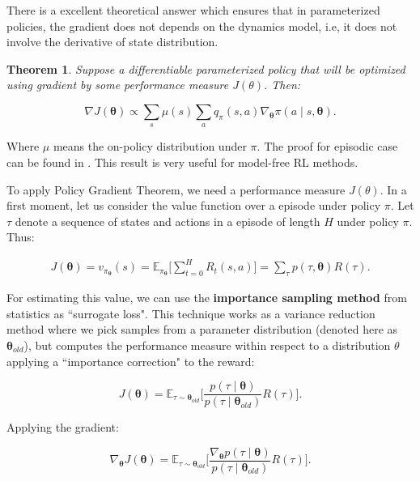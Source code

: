 There is a excellent theoretical answer which ensures that in parameterized policies, the gradient does not depends on the dynamics model, i.e, it does not involve the derivative of state distribution.

\newtheorem{pg}{Theorem}
\begin{pg}
	Suppose a differentiable parameterized policy that will be optimized using gradient by some performance measure $J(\theta)$. Then:
	
	\begin{equation}
	\nabla J(\boldsymbol{\theta}) \propto \sum_{s}\mu(s)\sum_{a} q_{\pi}(s, a)\nabla_{\boldsymbol{\theta}} \pi(a \mid s, \boldsymbol{\theta}).
	\end{equation}
\end{pg}

Where $\mu$ means the on-policy distribution under $\pi$. The proof for episodic case can be found in \cite{sutton1998rli}. This result is very useful for model-free RL methods.

To apply Policy Gradient Theorem, we need a performance measure $J(\theta)$. In a first moment, let us consider the value function over a episode under policy $\pi$. Let $\tau$ denote a sequence of states and actions in a episode of length $H$ under policy $\pi$. Thus:

\begin{align}
J(\boldsymbol{\theta})  = v_{\pi_{\boldsymbol{\theta}}}(s)
 = \mathbb{E}_{\pi_{\boldsymbol{\theta}}}\Bigg[ \sum_{t = 0}^{H}R_{t}(s, a) \Bigg] = \sum_{\tau} p(\tau, \boldsymbol{\theta}) R(\tau).
\end{align}

For estimating this value, we can use the \textbf{importance sampling method} \cite{NIPS2010_3922} from statistics as ``surrogate loss". This technique works as a variance reduction method where we pick samples from a parameter distribution (denoted here as $\boldsymbol{\theta}_{old}$), but computes the performance measure within respect to a distribution $\theta$ applying a ``importance correction" to the reward:

\begin{equation}\label{eq:optloss1}
J(\boldsymbol{\theta}) = \mathbb{E}_{\tau \sim \boldsymbol{\theta}_{old}} \Bigg[\frac{p(\tau \mid \boldsymbol{\theta})}{p(\tau \mid \boldsymbol{\theta}_{old})}R(\tau) \Bigg].
\end{equation}

Applying the gradient:

\begin{equation}
\nabla_{\boldsymbol{\theta}} J(\boldsymbol{\theta}) = \mathbb{E}_{\tau \sim \boldsymbol{\theta}_{old}} \Bigg[\frac{\nabla_{\boldsymbol{\theta}} p(\tau \mid \boldsymbol{\theta})}{p(\tau \mid \boldsymbol{\theta}_{old})}R(\tau) \Bigg].
\end{equation}

